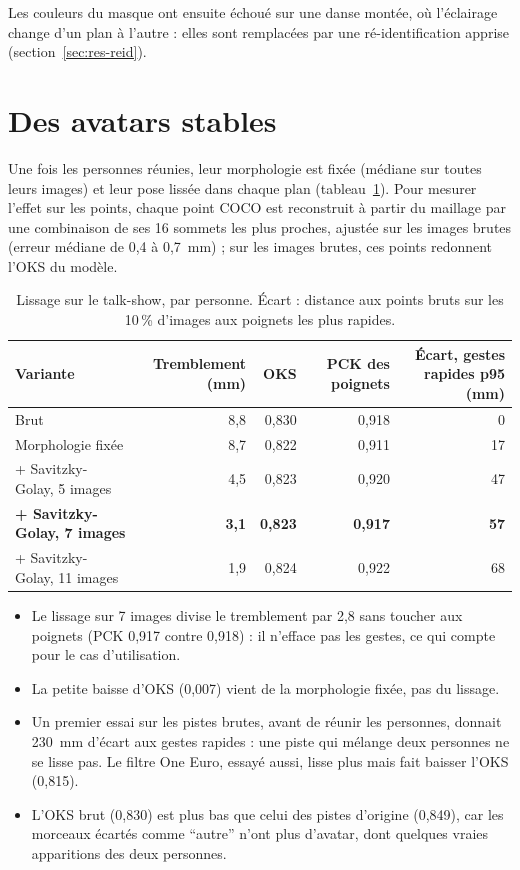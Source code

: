 \documentclass[11pt,a4paper]{report}
\begin{document}
Les couleurs du masque ont ensuite échoué sur une danse montée, où l'éclairage change d'un plan à l'autre : elles sont remplacées par
une ré-identification apprise (section~\ref{sec:res-reid}).

\section{Des avatars stables}
\label{sec:res-smooth}

Une fois les personnes réunies, leur morphologie est fixée (médiane sur toutes leurs images) et leur pose lissée dans chaque plan
(tableau~\ref{tab:smooth}). Pour mesurer l'effet sur les points, chaque point COCO est reconstruit à partir du maillage par une
combinaison de ses 16 sommets les plus proches, ajustée sur les images brutes (erreur médiane de 0,4 à 0,7~mm) ; sur les images brutes,
ces points redonnent l'OKS du modèle.

\begin{table}[H]
\centering
\caption{Lissage sur le talk-show, par personne. Écart : distance aux points bruts sur les 10\,\% d'images aux poignets les plus rapides.}
\label{tab:smooth}
\small
\begin{tabular}{@{}lrrrr@{}}
\toprule
Variante & Tremblement (mm) & OKS & PCK des poignets & Écart, gestes rapides p95 (mm) \\
\midrule
Brut & 8,8 & 0,830 & 0,918 & 0 \\
Morphologie fixée & 8,7 & 0,822 & 0,911 & 17 \\
+ Savitzky-Golay, 5 images & 4,5 & 0,823 & 0,920 & 47 \\
\textbf{+ Savitzky-Golay, 7 images} & \textbf{3,1} & \textbf{0,823} & \textbf{0,917} & \textbf{57} \\
+ Savitzky-Golay, 11 images & 1,9 & 0,824 & 0,922 & 68 \\
\bottomrule
\end{tabular}
\end{table}

\begin{itemize}
    \item Le lissage sur 7 images divise le tremblement par 2,8 sans toucher aux poignets (PCK 0,917 contre 0,918) : il n'efface pas
    les gestes, ce qui compte pour le cas d'utilisation.
    \item La petite baisse d'OKS (0,007) vient de la morphologie fixée, pas du lissage.
    \item Un premier essai sur les pistes brutes, avant de réunir les personnes, donnait 230~mm d'écart aux gestes rapides : une piste
    qui mélange deux personnes ne se lisse pas. Le filtre One Euro, essayé aussi, lisse plus mais fait baisser l'OKS (0,815).
    \item L'OKS brut (0,830) est plus bas que celui des pistes d'origine (0,849), car les morceaux écartés comme \enquote{autre} n'ont
    plus d'avatar, dont quelques vraies apparitions des deux personnes.
\end{itemize}
\end{document}
